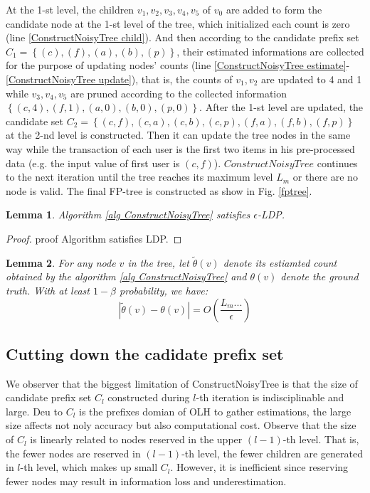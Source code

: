 \documentclass[conference]{IEEEtran}
\newtheorem{lemma}{Lemma}[section]
\newtheorem*{proof}{\text{$Proof.$}}
\begin{document}
At the 1-st level, the children $v_1,v_2,v_3,v_4,v_5$ of $v_0$ are added to form the candidate node at the 1-st level of the tree, which initialized each count is zero (line \ref{ConstructNoisyTree child}). And then according to the candidate prefix set $C_1 = \left\{ (c),(f),(a),(b),(p) \right\}$, their estimated informations are collected for the purpose of updating nodes' counts (line \ref{ConstructNoisyTree estimate}-\ref{ConstructNoisyTree update}), that is, the counts of $v_1,v_2$ are updated to 4 and 1 while $v_3,v_4,v_5$ are pruned according to the collected information $\left\{ (c,4),(f,1),(a,0),(b,0),(p,0) \right\}$. After the 1-st level are updated, the candidate set $C_2 = \left\{ (c,f),(c,a),(c,b),(c,p),(f,a),(f,b),(f,p) \right\}$ at the 2-nd level is constructed. Then it can update the tree nodes in the same way while the transaction of each user is the first two items in his pre-processed data (e.g. the input value of first user  is $(c,f)$). $ConstructNoisyTree$ continues to the next iteration until the tree reaches its maximum level $L_m$ or there are no node is valid. The final FP-tree is constructed as show in Fig. \ref{fptree}.

\begin{lemma}
Algorithm \ref{alg ConstructNoisyTree} satisfies $\epsilon$-LDP.
\end{lemma}

\begin{proof}
proof Algorithm satisfies LDP.
\end{proof}

\begin{lemma}
For any node $v$ in the tree, let $\tilde{\theta}(v)$ denote its estiamted count obtained by the algorithm \ref{alg ConstructNoisyTree} and $\theta (v)$ denote the ground truth. With at least $1-\beta$ probability, we have:
$$|\tilde{\theta}(v) - \theta(v) | = O \left(\frac{L_m...}{\epsilon} \right)$$
\end{lemma}

\subsection{Cutting down the cadidate prefix set}
\label{cutdown candidate}
We observer that the biggest limitation of ConstructNoisyTree is that the size of candidate prefix set $C_l$ constructed during $l$-th iteration is indisciplinable and large. Deu to $C_l$ is the prefixes domian of OLH to gather estimations, the large size affects not noly accuracy but also computational cost. Observe that the size of $C_l$ is linearly related to nodes reserved in the upper $(l-1)$-th level. That is, the fewer nodes are reserved in $(l-1)$-th level, the fewer children are generated in $l$-th level, which makes up small $C_l$. However, it is inefficient since reserving fewer nodes may result in information loss and underestimation.  
\end{document}
